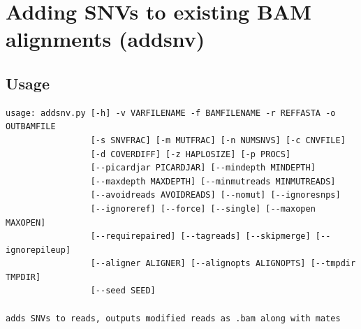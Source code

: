 \documentclass[letterpaper,11pt]{article}
\begin{document}
\section{Adding SNVs to existing BAM alignments (addsnv)}
\subsection{Usage}
\begin{verbatim}
usage: addsnv.py [-h] -v VARFILENAME -f BAMFILENAME -r REFFASTA -o OUTBAMFILE
                 [-s SNVFRAC] [-m MUTFRAC] [-n NUMSNVS] [-c CNVFILE]
                 [-d COVERDIFF] [-z HAPLOSIZE] [-p PROCS]
                 [--picardjar PICARDJAR] [--mindepth MINDEPTH]
                 [--maxdepth MAXDEPTH] [--minmutreads MINMUTREADS]
                 [--avoidreads AVOIDREADS] [--nomut] [--ignoresnps]
                 [--ignoreref] [--force] [--single] [--maxopen MAXOPEN]
                 [--requirepaired] [--tagreads] [--skipmerge] [--ignorepileup]
                 [--aligner ALIGNER] [--alignopts ALIGNOPTS] [--tmpdir TMPDIR]
                 [--seed SEED]

adds SNVs to reads, outputs modified reads as .bam along with mates


\end{verbatim}
\end{document}
